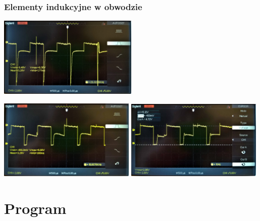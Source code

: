\begin{frame}
\frametitle{Elementy indukcyjne w obwodzie}  
\begin{center}
	\includegraphics[width=0.5\textwidth]{rys/przedSchottky.jpg}
\end{center}
\begin{center}
\includegraphics[width=0.49\textwidth]{rys/schottky.jpg}
\includegraphics[width=0.49\textwidth]{rys/schottkyZkondem.jpg}
\end{center}
\end{frame}

\section{Program}

